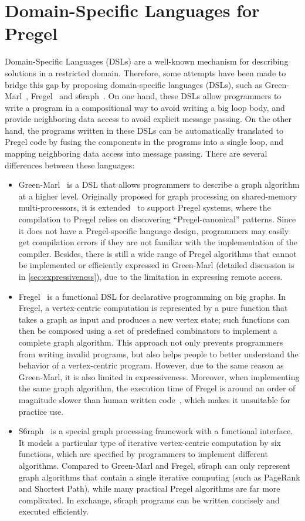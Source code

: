 \documentclass{sokendai_thesis} %
\begin{document}
\section{Domain-Specific Languages for Pregel}

Domain-Specific Languages (DSLs) are a well-known mechanism for describing solutions in a restricted domain.
Therefore, some attempts have been made to bridge this gap by proposing domain-specific languages (DSLs), such as Green-Marl~\cite{green14}, Fregel~\cite{fregel} and s6raph~\cite{s6raph}.
On one hand, these DSLs allow programmers to write a program in a compositional way to avoid writing a big loop body, and provide neighboring data access to avoid explicit message passing.
On the other hand, the programs written in these DSLs can be automatically translated to Pregel code by fusing the components in the programs into a single loop, and mapping neighboring data access into message passing.
There are several differences between these languages:
\begin{itemize}
\item
 Green-Marl~\cite{green12} is a DSL that allows programmers to describe a graph algorithm at a higher level.
 Originally proposed for graph processing on shared-memory multi-processors, it is extended~\cite{green14} to support Pregel systems, where the compilation to Pregel relies on discovering ``Pregel-canonical'' patterns.
 Since it does not have a Pregel-specific language design, programmers may easily get compilation errors if they are not familiar with the implementation of the compiler.
 Besides, there is still a wide range of Pregel algorithms that cannot be implemented or efficiently expressed in Green-Marl (detailed discussion is in \autoref{sec:expressiveness}), due to the limitation in expressing remote access.
\item
 Fregel~\cite{fregel} is a functional DSL for declarative programming on big graphs.
 In Fregel, a vertex-centric computation is represented by a pure function that takes a graph as input and produces a new vertex state; such functions can then be composed using a set of predefined combinators to implement a complete graph algorithm.
 This approach not only prevents programmers from writing invalid programs, but also helps people to better understand the behavior of a vertex-centric program.
 However, due to the same reason as Green-Marl, it is also limited in expressiveness.
 Moreover, when implementing the same graph algorithm, the execution time of Fregel is around an order of magnitude slower than human written code~\cite{fregel}, which makes it unsuitable for practice use.
\item
 S6raph~\cite{s6raph} is a special graph processing framework with a functional interface. It models a particular type of iterative vertex-centric computation by six functions, which are specified by programmers to implement different algorithms.
 Compared to Green-Marl and Fregel, s6raph can only represent graph algorithms that contain a single iterative computing (such as PageRank and Shortest Path), while many practical Pregel algorithms are far more complicated.
In exchange, s6raph programs can be written concisely and executed efficiently.
\end{itemize}
\end{document}
